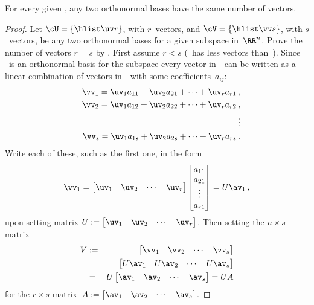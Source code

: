 \begin{theorem} \label{thm:sameD} 
For every given , any two orthonormal bases have the same number of vectors.
\end{theorem}
\begin{proof} 
Let \(\cU=\{\hlist\uv r\}\), with \(r\)~vectors, and \(\cV=\{\hlist\vv s\}\), with \(s\)~vectors, be any two orthonormal bases for a given subspace in~\(\RR^n\).
Prove the number of vectors \(r=s\) by .
First assume \(r<s\) (\cU\ has less vectors than~\cV).
Since \cU\ is an orthonormal basis for the subspace every vector in~\cV\ can be written as a linear combination of vectors in~\cU\ with some coefficients~\(a_{ij}\):
\begin{eqnarray*}
  &&\vv_1=\uv_1a_{11}+\uv_2a_{21}+\cdots+\uv_ra_{r1}\,,
\\&&\vv_2=\uv_1a_{12}+\uv_2a_{22}+\cdots+\uv_ra_{r2}\,,
\\&&\qquad\vdots
\\&&\vv_s=\uv_1a_{1s}+\uv_2a_{2s}+\cdots+\uv_ra_{rs}\,.
\end{eqnarray*}
Write each of these, such as the first one, in the form
\begin{equation*}
\vv_1=\begin{bmatrix} \uv_1&\uv_2&\cdots&\uv_r \end{bmatrix}
\begin{bmatrix} a_{11}\\a_{21}\\\vdots\\a_{r1} \end{bmatrix}
=U\av_1\,,
\end{equation*}
upon setting matrix \(U:=\begin{bmatrix} \uv_1&\uv_2&\cdots&\uv_r \end{bmatrix}\).
Then setting the \(n\times s\) matrix
\begin{eqnarray*}
V&:=&\begin{bmatrix} \vv_1&\vv_2&\cdots&\vv_s \end{bmatrix}
\\&=&\begin{bmatrix} U\av_1& U\av_2&\cdots&U\av_s\end{bmatrix}
\\&=&U\begin{bmatrix} \av_1& \av_2&\cdots&\av_s\end{bmatrix}
=UA
\end{eqnarray*}
for the \(r\times s\) matrix~\(A:=\begin{bmatrix} \av_1& \av_2&\cdots&\av_s \end{bmatrix}\).

\end{proof}
